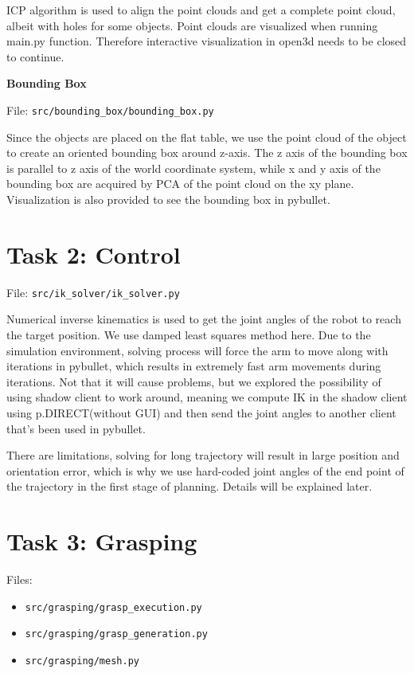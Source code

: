 \documentclass[
	english,
	accentcolor=11d,%
	type=intern,
	marginpar=false,
    logofile=media/PEARLTUDA.png
	]{tudapub}
\let\code\texttt
\begin{document}
ICP algorithm is used to align the point clouds and get a complete point cloud, albeit with holes for some objects. Point clouds are visualized when running main.py function. Therefore interactive visualization in open3d needs to be closed to continue.

\vspace{0.5cm}
\noindent\textbf{Bounding Box}

\noindent File: \code{src/bounding\_box/bounding\_box.py}

Since the objects are placed on the flat table, we use the point cloud of the object to create an oriented bounding box around z-axis. The z axis of the bounding box is parallel to z axis of the world coordinate system, while x and y axis of the bounding box are acquired by PCA of the point cloud on the xy plane. Visualization is also provided to see the bounding box in pybullet.

\section{Task 2: Control}
\noindent File: \code{src/ik\_solver/ik\_solver.py}

Numerical inverse kinematics is used to get the joint angles of the robot to reach the target position. We use damped least squares method here. Due to the simulation environment, solving process will force the arm to move along with iterations in pybullet, which results in extremely fast arm movements during iterations. Not that it will cause problems, but we explored the possibility of using shadow client to work around, meaning we compute IK in the shadow client using p.DIRECT(without GUI) and then send the joint angles to another client that's been used in pybullet.

There are limitations, solving for long trajectory will result in large position and orientation error, which is why we use hard-coded joint angles of the end point of the trajectory in the first stage of planning. Details will be explained later.

\section{Task 3: Grasping}
Files: 
\begin{itemize}
\item \code{src/grasping/grasp\_execution.py}
\item \code{src/grasping/grasp\_generation.py}
\item \code{src/grasping/mesh.py}
\end{itemize}
\end{document}
